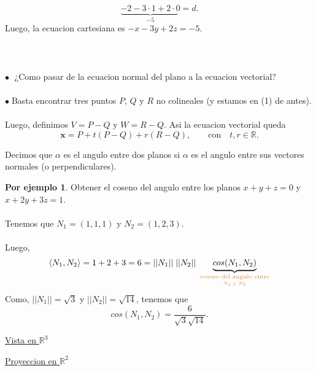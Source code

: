\documentclass{article}
\theoremstyle{definition}
\theoremstyle{definition}
\newtheorem*{ej}{Por ejemplo}
\theoremstyle{remark}
\newcommand\bl{$\bullet\;$}
\begin{document}
\[ 
  \underbrace{-2-3\cdot 1 + 2\cdot 0 }_{-5}=d.
\] Luego, la ecuacion cartesiana es $-x-3y+2z = -5$.
\\\\\\\\
\textcolor{rojop2}{\bl} ¿Como pasar de la ecuacion normal del plano a la ecuacion vectorial? \\\\ \bl Basta encontrar tres puntos $P$, $Q$ y $R$ no colineales (y estamos en \textcolor{rojop2}{(1)} de antes). \\\\ Luego, definimos $V=P-Q$ y $W=R-Q$. Asi la ecuacion vectorial queda \[
  \mathbf{x}=P+t(P-Q)+r(R-Q),\quad \quad \text{con} \quad t,r \in \mathbb{R}.
\]
\begin{defi}
 Decimos que $\alpha$ es el angulo entre dos planos si $\alpha$ es el angulo entre sus vectores normales (o perpendiculares).
\end{defi}
\begin{ej}
  Obtener el coseno del angulo entre los planos $x+y+z=0$ y $x+2y+3z=1$. \\\\ Tenemos que $N_1=(1,1,1)$ y $N_2=(1,2,3)$. \\\\ Luego, \[ 
    \langle N_1,N_2 \rangle = 1+2+3=6= ||N_1|| \; ||N_2|| \; \underbrace{cos(N_1,N_2)}_{\textcolor{rojop2}{\underset{N_1 \text{ y } N_2}{\text{coseno del angulo entre}}}}
    \]  Como, $||N_1||=\sqrt{3}$ y $||N_2||=\sqrt{14}$, tenemos que \[ 
    cos(N_1,N_2)=\frac{6}{\sqrt{3}\sqrt{14}}.
  \]
\end{ej} \pagebreak
\underline{Vista en $\mathbb{R}^3$} 

\begin{figure}[h]
\centering
\def\svgwidth{0.55\textwidth}

\end{figure}

\underline{Proyeccion en $\mathbb{R}^2$}
\end{document}
